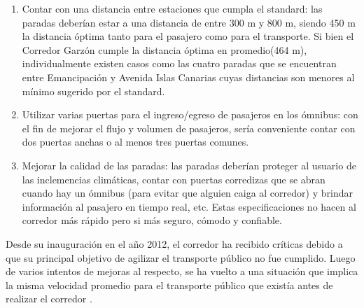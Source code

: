 \begin{enumerate}
	\item Contar con una distancia entre estaciones que cumpla el standard:  las paradas deberían estar a una distancia de entre 300 m y 800 m, siendo 450 m la distancia óptima tanto para el pasajero como para el transporte. Si bien el Corredor Garzón cumple la distancia óptima en promedio(464 m), individualmente existen casos como las cuatro paradas que se encuentran entre Emancipación y Avenida Islas Canarias cuyas distancias son menores al mínimo sugerido por el standard.
	\item Utilizar varias puertas para el ingreso/egreso de pasajeros en los ómnibus: con el fin de mejorar el flujo y volumen de pasajeros, sería conveniente contar con dos puertas anchas o al menos tres puertas comunes.
	\item Mejorar la calidad de las paradas: las paradas deberían proteger al usuario de las inclemencias climáticas, contar con puertas corredizas que se abran cuando hay un ómnibus (para evitar que alguien caiga al corredor) y brindar información al pasajero en tiempo real, etc. Estas especificaciones no hacen al corredor más rápido pero si más seguro, cómodo y confiable.
\end{enumerate}

Desde su inauguración en el año 2012, el corredor ha recibido críticas debido a que su principal objetivo de agilizar el transporte público no fue cumplido. Luego de varios intentos de mejoras al respecto, se ha vuelto a una situación que implica la misma velocidad promedio para el transporte público que existía antes de realizar el corredor \citep{olivera2015}.

